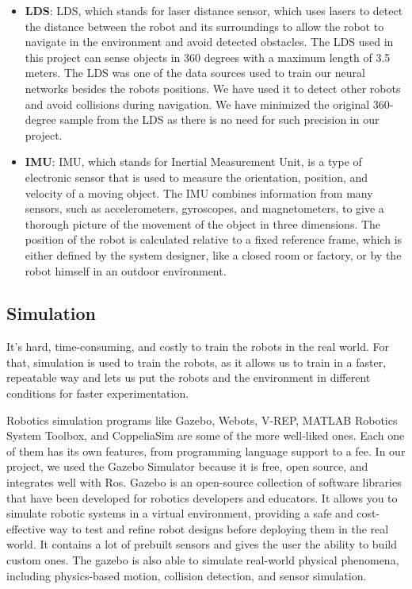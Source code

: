 \documentclass[12pt]{extarticle}
\begin{document}
\begin{itemize}
\item \textbf{LDS}:  LDS, which stands for laser distance sensor, which uses lasers to detect the distance between the robot and its surroundings to allow the robot to navigate in the environment and avoid detected obstacles. The LDS used in this project can sense objects in 360 degrees with a maximum length of 3.5 meters. The LDS was one of the data sources used to train our neural networks besides the robots positions. We have used it to detect other robots and avoid collisions during navigation. We have minimized the original 360-degree sample from the LDS as there is no need for such precision in our project.

     
\item \textbf{IMU}: IMU, which stands for Inertial Measurement Unit, is a type of electronic sensor that is used to measure the orientation, position, and velocity of a moving object. The IMU combines information from many sensors, such as accelerometers, gyroscopes, and magnetometers, to give a thorough picture of the movement of the object in three dimensions. The position of the robot is calculated relative to a fixed reference frame, which is either defined by the system designer, like a closed room or factory, or by the robot himself in an outdoor environment.






\end{itemize}

   



\subsection{Simulation}
It's hard, time-consuming, and costly to train the robots in the real world. For that, simulation is used to train the robots, as it allows us to train in a faster, repeatable way and lets us put the robots and the environment in different conditions for faster experimentation.

Robotics simulation programs like Gazebo, Webots, V-REP, MATLAB Robotics System Toolbox, and CoppeliaSim are some of the more well-liked ones. Each one of them has its own features, from programming language support to a fee.
In our project, we used the Gazebo Simulator because it is free, open source, and integrates well with Ros.
Gazebo is an open-source collection of software libraries that have been developed for robotics developers and educators.
It allows you to simulate robotic systems in a virtual environment, providing a safe and cost-effective way to test and refine robot designs before deploying them in the real world. It contains a lot of prebuilt sensors and gives the user the ability to build custom ones. The gazebo is also able to simulate real-world physical phenomena, including physics-based motion, collision detection, and sensor simulation.
  
\end{document}
